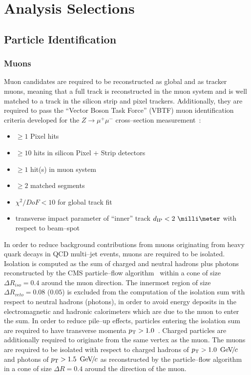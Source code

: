 \ifx\master\undefined\fi

\chapter{Analysis Selections}
\label{ch:selections}

\section{Particle Identification}
\subsection{Muons}
\label{sec:MuonId}

Muon candidates are required to be reconstructed as global and as tracker muons,
meaning that a full track is reconstructed in the muon system and is well
matched to a track in the silicon strip and pixel trackers.
Additionally, they are required to pass the ``Vector Boson Task Force'' (VBTF)
muon identification criteria developed for the $Z \to \mu^{+} \mu^{-}$
cross--section measurement~\cite{CMS-PAS-EWK-10-002}:
\begin{itemize}
\item $\geq 1$ Pixel hits
\item $\geq 10$ hits in silicon Pixel $+$ Strip detectors
\item $\geq 1$ hit(s) in muon system
\item $\geq 2$ matched segments
\item $\chi^{2}/DoF < 10$ for global track fit
\item transverse impact parameter of ``inner'' track $d_\text{IP} < 2~\milli\meter$
  with respect to beam--spot
\end{itemize}

In order to reduce background contributions from muons originating from heavy
quark decays in QCD multi--jet events, muons are required to be isolated.
Isolation is computed as the \pt sum of charged and neutral hadrons plus photons
reconstructed by the CMS particle--flow algorithm~\cite{CMS-PAS-PFT-09-001} within a
cone of size $\Delta R_{iso} = 0.4$ around the muon direction.  The innermost
region of size $\Delta R_{veto} = 0.08$ ($0.05$) is excluded from the
computation of the isolation \pt sum with respect to neutral hadrons (photons),
in order to avoid energy deposits in the electromagnetic and hadronic
calorimeters which are due to the muon to enter the sum.  In order to reduce
pile--up effects, particles entering the isolation \pt sum are required to have
transverse momenta $p_{\mathrm{T}} > 1.0$~\GeVc.  Charged particles are additionally
required to originate from the same vertex as the muon.  The muons are required
to be isolated with respect to charged hadrons of $p_{\mathrm{T}} > 1.0~{\,\text{Ge\hspace{-.08em}V\hspace{-0.16em}/\hspace{-0.08em}}c}$ and photons
of $p_{\mathrm{T}} > 1.5~{\,\text{Ge\hspace{-.08em}V\hspace{-0.16em}/\hspace{-0.08em}}c}$ as reconstructed by the particle--flow
algorithm~\cite{CMS-PAS-PFT-09-001} in a cone of size $\Delta R = 0.4$ around
the direction of the muon.

